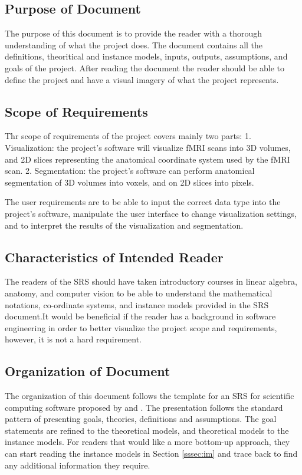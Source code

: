 \documentclass[12pt]{article}
\begin{document}
\subsection{Purpose of Document}

The purpose of this document is to provide the reader with a thorough understanding
of what the project does. The document contains all the definitions, theoritical and
instance models, inputs, outputs, assumptions, and goals of the project. After reading
the document the reader should be able to define the project and have a visual imagery
of what the project represents.
\subsection{Scope of Requirements}

Thr scope of requirements of the project covers mainly two parts:
1. Visualization: the project's software will visualize fMRI scans into 3D volumes,
and 2D slices representing the anatomical coordinate system used by the fMRI scan.
2. Segmentation: the project's software can perform anatomical segmentation of 3D volumes into voxels,
and on 2D slices into pixels.

The user requirements are to be able to input the correct data type into the project's
software, manipulate the user interface to change visualization settings, and to interpret
the results of the visualization and segmentation.


\subsection{Characteristics of Intended Reader} \label{sec_IntendedReader}

The readers of the SRS should have taken introductory courses in linear algebra, anatomy,
and computer vision to be able to understand the mathematical notations, co-ordinate systems,
and instance models provided in the SRS document.It would be beneficial if the reader has a
background in software engineering in order to better visualize the project scope and requirements,
however, it is not a hard requirement.

\subsection{Organization of Document}

The organization of this document follows the template for an SRS for
scientific computing software proposed by \cite{Koothoor2013} and
\cite{SmithAndLai2005}. The presentation follows the standard pattern of presenting goals, theories, definitions and
assumptions. The goal statements are refined to the theoretical models, and
theoretical models to the instance models. For readers that would like a more bottom-up
approach, they can start reading the instance models in Section
\ref{sssec:im} and trace back to find any additional information they require.
\end{document}
